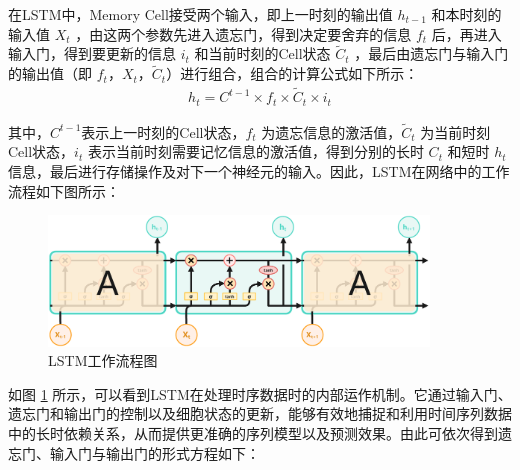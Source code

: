 在LSTM中，Memory Cell接受两个输入，即上一时刻的输出值 $h_{t-1}$ 和本时刻的输入值 $X_t$ ，由这两个参数先进入遗忘门，得到决定要舍弃的信息 $f_{t}$ 后，再进入输入门，得到要更新的信息 $i_t$ 和当前时刻的Cell状态 $\widetilde{C}_t$ ，最后由遗忘门与输入门的输出值（即 $f_t$，$X_t$，$\widetilde{C}_t$）进行组合，组合的计算公式如下所示：
\begin{align}
    h_t = C^{t-1} \times f_t \times \widetilde{C}_t \times i_t
\end{align}

其中，$C^{t-1}$表示上一时刻的Cell状态，$f_t$ 为遗忘信息的激活值，$\widetilde{C}_t$ 为当前时刻Cell状态，$i_t$ 表示当前时刻需要记忆信息的激活值，得到分别的长时 $C_t$ 和短时 $h_t$ 信息，最后进行存储操作及对下一个神经元的输入。因此，LSTM在网络中的工作流程如下图所示：


\begin{figure}[ht]
  \centering
  \includegraphics[width=0.9\textwidth]{./Img/LSTM工作流程图.pdf}
  \caption{LSTM工作流程图}\label{fig:aa-2}
\end{figure}

如图 \ref{fig:aa-2} 所示，可以看到LSTM在处理时序数据时的内部运作机制。它通过输入门、遗忘门和输出门的控制以及细胞状态的更新，能够有效地捕捉和利用时间序列数据中的长时依赖关系，从而提供更准确的序列模型以及预测效果。由此可依次得到遗忘门、输入门与输出门的形式方程如下：

